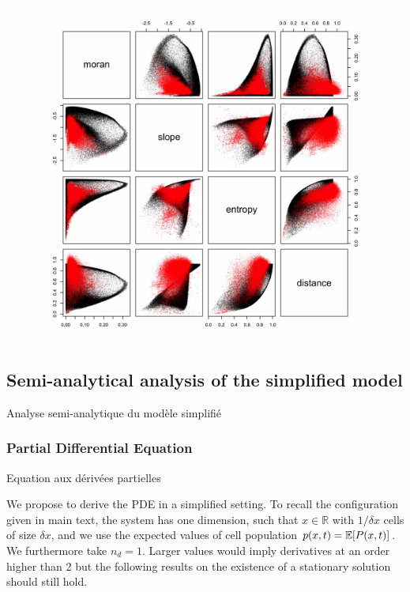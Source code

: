\begin{figure}
\includegraphics[width=\textwidth]{Figures/Density/scatter}
\label{fig:densityscatter}
\end{figure}





\subsection{Semi-analytical analysis of the simplified model}{Analyse semi-analytique du modèle simplifié}


\subsubsection{Partial Differential Equation}{Equation aux dérivées partielles}

We propose to derive the PDE in a simplified setting. To recall the configuration given in main text, the system has one dimension, such that $x\in \mathbb{R}$ with $1/\delta x$ cells of size $\delta x$, and we use the expected values of cell population $p(x,t) = \operatorname{\mathbb{E}}\!\left[P(x,t)\right]$. We furthermore take $n_d=1$. Larger values would imply derivatives at an order higher than 2 but the following results on the existence of a stationary solution should still hold. 

